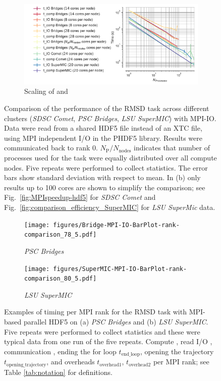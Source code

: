 \begin{figure}[!htb]
  \begin{subfigure} {\textwidth}
    \includegraphics[width=\linewidth]{figures/Clusters_IO_compute_scaling_edited.pdf}
    \captionsetup{format=hang}
    \caption{Scaling of \tcomp and \tIO}
    \label{fig:compute-IO-scaling-clusters}
  \end{subfigure}
  \caption{Comparison of the performance of the RMSD task across different clusters (\emph{SDSC Comet}, \emph{PSC Bridges}, \emph{LSU SuperMIC}) with MPI-IO.
    Data were read from a shared HDF5 file instead of an XTC file, using MPI independent I/O in the PHDF5 library.
    Results were communicated back to rank 0.
    $N_{\text{P}}/N_{\text{nodes}}$ indicates that number of processes used for the task were equally distributed over all compute nodes.
    Five repeats were performed to collect statistics.
    The error bars show standard deviation with respect to mean.
    In (b) only results up to 100 cores are shown to simplify the comparison; see Fig.~\protect\ref{fig:MPIspeedup-hdf5} for \emph{SDSC Comet} and Fig.~\protect\ref{fig:comparison_efficiency_SuperMIC} for \emph{LSU SuperMic} data.
  }
\label{fig:MPIwithIO-clusters}
\end{figure} 

\begin{figure}[!htb]
  \centering
  \begin{subfigure}{.49\textwidth}
    \texttt{[image: figures/Bridge-MPI-IO-BarPlot-rank-comparison\_78\_5.pdf]}
    \caption{\emph{PSC Bridges}}
    \label{fig:hdf5-bridge}
  \end{subfigure}
  \bigskip
  \begin{subfigure} {.49\textwidth}
    \texttt{[image: figures/SuperMIC-MPI-IO-BarPlot-rank-comparison\_80\_5.pdf]}
    \caption{\emph{LSU SuperMIC}}
    \label{fig:hdf5-SuperMIC}
  \end{subfigure}
  \caption{Examples of timing per MPI rank for the RMSD task with MPI-based parallel HDF5 on (a) \emph{PSC Bridges} and (b) \emph{LSU SuperMIC}.
    Five repeats were performed to collect statistics and these were typical data from one run of the five repeats. Compute \tcomp, read I/O \tIO, communication \tcomm, ending the for loop $t_{\text{end\_loop}}$,  opening the trajectory $t_{\text{opening\_trajectory}}$, and overheads $t_{\text{overhead1}}$, $t_{\text{overhead2}}$ per MPI rank; see Table \ref{tab:notation} for definitions.}
  \label{fig:MPIwithIO-clusters-rank}
\end{figure} 

